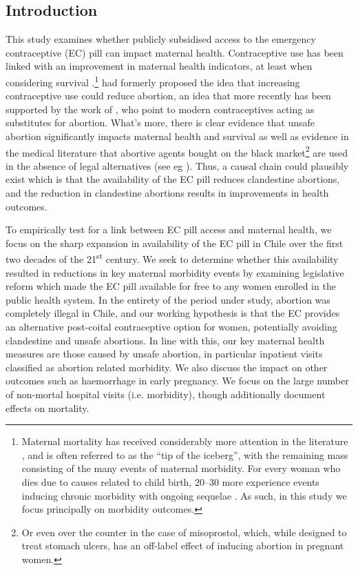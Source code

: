 \documentclass[12pt]{article}
\begin{document}
\begin{spacing}{1.9}
\section{Introduction}
This study examines whether publicly subsidised access to the emergency contraceptive (EC) pill can impact maternal health.   Contraceptive use has been linked with an improvement in maternal health indicators, at least when considering survival \citep{Clelandetal2012,StoverRoss2010}.\footnote{Maternal mortality has received considerably more attention in the literature \citep{Loudon2000}, and is often referred to as the ``tip of the iceberg'', with the remaining mass consisting of the many events of maternal morbidity. For every woman who dies due to causes related to child birth, 20--30 more experience events inducing chronic morbidity with ongoing sequelae \citep{Reichenheimetal2009,Firozetal2013}.  As such, in this study we focus principally on morbidity outcomes.} \citet{BongaartsWestoff2000} had formerly proposed the idea that increasing contraceptive use could reduce abortion, an idea that more recently has been supported by the work of \citet{MillerValente2016}, who point to modern contraceptives acting as substitutes for abortion. What's more, there is clear evidence that unsafe abortion significantly impacts maternal health and survival \citep{unitedabortion,Grimes2006} as well as evidence in the medical literature that abortive agents bought on the black market\footnote{Or even over the counter in the case of misoprostol, which, while designed to treat stomach ulcers, has an off-label effect of inducing abortion in pregnant women.} are used in the absence of legal alternatives (see eg \citet{Grimes2006}). Thus, a causal chain could plausibly exist which is that the availability of the EC pill reduces clandestine abortions, and the reduction in clandestine abortions results in improvements in health outcomes.  


To empirically test for a link between EC pill access and maternal health, we focus on the sharp expansion in availability of the EC pill in Chile over the first two decades of the 21\textsuperscript{st} century.  We seek to determine whether this availability resulted in reductions in key maternal morbidity events by examining legislative reform which made the EC pill available for free to any women enrolled in the public health system.  In the entirety of the period under study, abortion was completely illegal in Chile, and our working hypothesis is that the EC provides an alternative post-coital contraceptive option for women, potentially avoiding clandestine and unsafe abortions.  In line with this, our key maternal health measures are those caused by unsafe abortion, in particular inpatient visits classified as abortion related morbidity.  We also discuss the impact on other outcomes such as haemorrhage in early pregnancy.  We focus on the large number of non-mortal hospital visits (i.e. morbidity), though additionally document effects on mortality.


\end{spacing}
\end{document}
